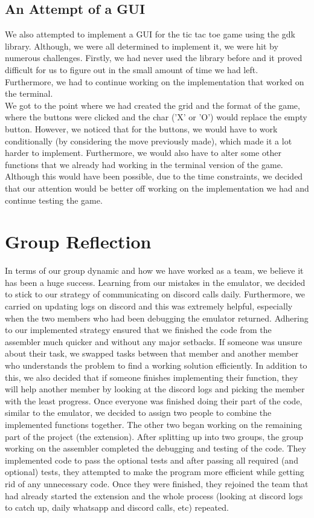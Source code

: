 \documentclass[10pt]{article}
\begin{document}
\subsection{An Attempt of a GUI}
We also attempted to implement a GUI for the tic tac toe game using the gdk library. Although, we were all determined to implement it, we were hit by numerous challenges. Firstly, we had never used the library before and it proved difficult for us to figure out in the small amount of time we had left. Furthermore, we had to continue working on the implementation that worked on the terminal.
\\We got to the point where we had created the grid and the format of the game, where the buttons were clicked and the char ('X' or 'O') would replace the empty button. However, we noticed that for the buttons, we would have to work conditionally (by considering the move previously made), which made it a lot harder to implement. Furthermore, we would also have to alter some other functions that we already had working in the terminal version of the game. Although this would have been possible, due to the time constraints, we decided that our attention would be better off working on the implementation we had and continue testing the game. 

\section{Group Reflection}
In terms of our group dynamic and how we have worked as a team, we believe it has been a huge success. Learning from our mistakes in the emulator, we decided to stick to our strategy of communicating on discord calls daily. Furthermore, we carried on updating logs on discord and this was extremely helpful, especially when the two members who had been debugging the emulator returned. Adhering to our implemented strategy ensured that we finished the code from the assembler much quicker and without any major setbacks. If someone was unsure about their task, we swapped tasks between that member and another member who understands the problem to find a working solution efficiently. In addition to this, we also decided that if someone finishes implementing their function, they will help another member by looking at the discord logs and picking the member with the least progress. Once everyone was finished doing their part of the code, similar to the emulator, we decided to assign two people to combine the implemented functions together. The other two began working on the remaining part of the project (the extension). After splitting up into two groups, the group working on the assembler completed the debugging and testing of the code. They implemented code to pass the optional tests and after passing all required (and optional) tests, they attempted to make the program more efficient while getting rid of any unnecessary code. Once they were finished, they rejoined the team that had already started the extension and the whole process (looking at discord logs to catch up, daily whatsapp and discord calls, etc) repeated.
\end{document}
